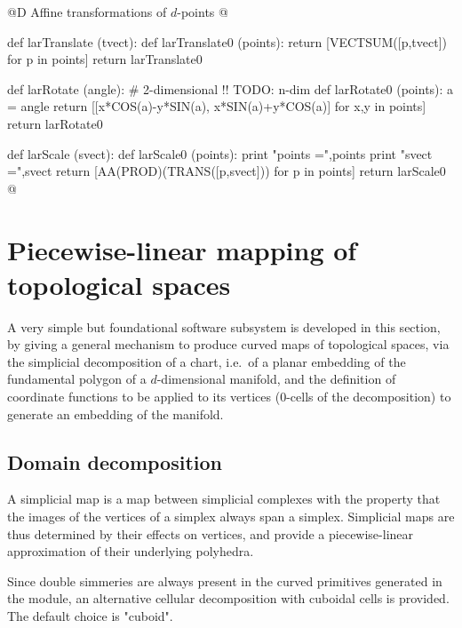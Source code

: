 \documentclass[11pt,oneside]{article}    %
\begin{document}
@D Affine transformations of $d$-points
@{def larTranslate (tvect):
    def larTranslate0 (points):
        return [VECTSUM([p,tvect]) for p in points]
    return larTranslate0

def larRotate (angle):        # 2-dimensional !! TODO: n-dim
    def larRotate0 (points):
        a = angle
        return [[x*COS(a)-y*SIN(a), x*SIN(a)+y*COS(a)] for x,y in points]
    return larRotate0

def larScale (svect):
    def larScale0 (points):
        print "\n points =",points
        print "\n svect =",svect
        return [AA(PROD)(TRANS([p,svect])) for p in points]
    return larScale0
@}


\section{Piecewise-linear mapping of topological spaces}

A very simple but foundational software subsystem is developed in this section, by giving a general mechanism to produce curved maps of topological spaces, via the simplicial decomposition of a chart, i.e.~of a planar embedding of the fundamental polygon of a $d$-dimensional manifold, and the definition of coordinate functions to be applied to its vertices ($0$-cells of the decomposition) to generate an embedding of the manifold.

\subsection{Domain decomposition}

A simplicial map is a map between simplicial complexes with the property that the images of the vertices of a simplex always span a simplex.  Simplicial maps are thus determined by their effects on vertices, and provide a piecewise-linear approximation of their underlying polyhedra. 

Since double simmeries are always present in the curved primitives generated in the module, an alternative cellular decomposition with cuboidal cells is provided.  The default choice is "cuboid".
\end{document}

